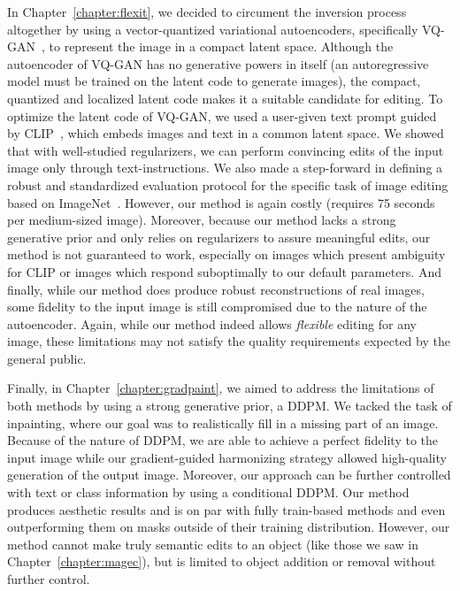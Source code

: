 In Chapter~\ref{chapter:flexit}, we decided to circument the inversion process altogether by using a vector-quantized  variational autoencoders, 
specifically VQ-GAN~\citep{esser2021taming}, to represent the image in a compact latent space. Although the autoencoder of VQ-GAN has no 
generative powers in itself (an autoregressive model must be trained on the latent code to generate images), the compact, quantized and localized 
latent code makes it a suitable candidate for editing. To optimize the latent code of VQ-GAN, we used a user-given text prompt guided by 
 \ac{CLIP}~\citep{radford2021learning}, 
which embeds images and text in a common latent space. We showed that with well-studied regularizers, we can perform convincing edits of the input 
image only through text-instructions. We also made a step-forward in defining a robust and standardized evaluation protocol for the specific task of
 image editing based on ImageNet~\citep{deng2009imagenet}. However, our method is again costly (requires 75 seconds per medium-sized image). 
 Moreover, because our method lacks a strong generative prior and only relies on regularizers to assure meaningful edits, our method is not guaranteed to work, 
 especially on images which present ambiguity for \ac{CLIP} or images which respond suboptimally to our default parameters. And finally, while our method 
 does produce robust reconstructions of real images, some fidelity to the input image is still compromised due to the nature of the autoencoder. Again, 
 while our method indeed allows \emph{flexible} editing for any image, these limitations may not satisfy the quality requirements expected by the general public.

Finally, in Chapter~\ref{chapter:gradpaint}, we aimed to address the limitations of both methods by using a strong generative prior, a \ac{DDPM}. We 
tacked the task of inpainting, where our goal was to realistically fill in a missing part of an image. Because of the nature of \ac{DDPM}, we are able 
to achieve a perfect fidelity to the input image while our gradient-guided harmonizing strategy allowed high-quality generation of the output image.
Moreover, our approach can be further controlled with text or class information by using a conditional \ac{DDPM}. Our method produces aesthetic results
and is on par with fully train-based methods and even outperforming them on masks outside of their training distribution. However, our method cannot make 
truly semantic edits to an object (like those we saw in Chapter~\ref{chapter:magec}), but is limited to object addition or removal without further control.


